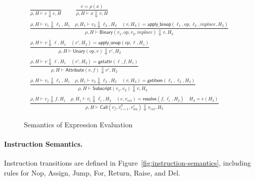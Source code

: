 \begin{figure*}[t]
\centering
\[
\begin{array}{c}
\frac{}{\rho,H \vdash c \Downarrow c,H}
\qquad
\frac{v=\rho(x)}{\rho,H \vdash x \Downarrow v,H}
\\[1.5ex]
\frac{\rho,H \vdash v_1 \Downarrow \ell_1,H_1 \quad
      \rho,H_1 \vdash v_2 \Downarrow \ell_2,H_2 \quad
      (v,H_3) = \mathsf{apply\_binop}(\ell_1,op,\ell_2,inplace,H_2)}
     {\rho,H \vdash \mathsf{Binary}(v_1,op,v_2,inplace) \Downarrow v,H_3}
\\[1.5ex]
\frac{\rho,H \vdash v \Downarrow \ell,H_1 \quad
      (v',H_2) = \mathsf{apply\_unop}(op,\ell,H_1)}
     {\rho,H \vdash \mathsf{Unary}(op,v) \Downarrow v',H_2}
\\[1.5ex]
\frac{\rho,H \vdash v \Downarrow \ell,H_1 \quad
      (v',H_2) = \mathsf{getattr}(\ell,f,H_1)}
     {\rho,H \vdash \mathsf{Attribute}(v,f) \Downarrow v',H_2}
\\[1.5ex]
\frac{\rho,H \vdash v_1 \Downarrow \ell_1,H_1 \quad
      \rho,H_1 \vdash v_2 \Downarrow \ell_2,H_2 \quad
      (v,H_3) = \mathsf{getitem}(\ell_1,\ell_2,H_2)}
     {\rho,H \vdash \mathsf{Subscript}(v_1,v_2) \Downarrow v,H_3}
\\[1.5ex]
\frac{\rho,H \vdash v_f \Downarrow f,H_1 \quad
      \rho,H_1 \vdash \overline{v_i} \Downarrow \overline{\ell_i},H_2 \quad
      (e,v_{ret}) = \mathsf{resolve}(f,\overline{\ell_i},H_2) \quad
      H_3 = e(H_2)}
     {\rho,H \vdash \mathsf{Call}(v_f,\overline{v}_{i=1}^{n},v_{kw}^{?}) \Downarrow v_{ret},H_3}
\end{array}
\]
\caption{Semantics of Expression Evaluation}
\label{fig:expression-semantics}
\end{figure*}

\paragraph{Instruction Semantics.}
Instruction transitions are defined in Figure~\ref{fig:instruction-semantics}, including rules for \textsf{Nop}, \textsf{Assign}, \textsf{Jump}, \textsf{For}, \textsf{Return}, \textsf{Raise}, and \textsf{Del}.

